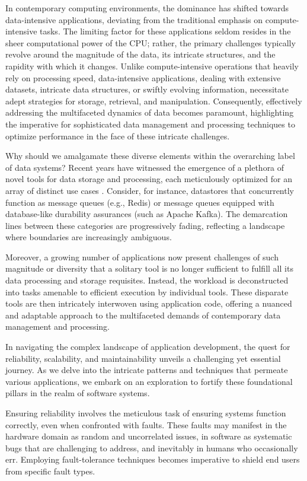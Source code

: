 
In contemporary computing environments, the dominance has shifted towards data-intensive applications,
deviating from the traditional emphasis on compute-intensive tasks.
The limiting factor for these applications seldom resides in the sheer computational power of the CPU;
rather, the primary challenges typically revolve around the magnitude of the data, its intricate structures,
and the rapidity with which it changes. Unlike compute-intensive operations that heavily rely on processing speed,
data-intensive applications, dealing with extensive datasets, intricate data structures, or swiftly evolving information,
necessitate adept strategies for storage, retrieval, and manipulation.
Consequently, effectively addressing the multifaceted dynamics of data becomes paramount,
highlighting the imperative for sophisticated data management and processing techniques to optimize performance in the face of these intricate challenges.

Why should we amalgamate these diverse elements within the overarching label of data systems?
Recent years have witnessed the emergence of a plethora of novel tools for data storage and processing,
each meticulously optimized for an array of distinct use cases \cite{stonebraker2005onesize}.
Consider, for instance, datastores that concurrently function as message queues (e.g., Redis)
or message queues equipped with database-like durability assurances (such as Apache Kafka).
The demarcation lines between these categories are progressively fading, reflecting a landscape where boundaries are increasingly ambiguous.

Moreover, a growing number of applications now present challenges of such magnitude or diversity that a solitary tool is no longer sufficient to fulfill all its data processing and storage requisites. Instead, the workload is deconstructed into tasks amenable to efficient execution by individual tools. These disparate tools are then intricately interwoven using application code, offering a nuanced and adaptable approach to the multifaceted demands of contemporary data management and processing.

In navigating the complex landscape of application development, the quest for reliability, scalability, and maintainability unveils a challenging yet essential journey. As we delve into the intricate patterns and techniques that permeate various applications, we embark on an exploration to fortify these foundational pillars in the realm of software systems.

Ensuring reliability involves the meticulous task of ensuring systems function correctly, even when confronted with faults. These faults may manifest in the hardware domain as random and uncorrelated issues, in software as systematic bugs that are challenging to address, and inevitably in humans who occasionally err. Employing fault-tolerance techniques becomes imperative to shield end users from specific fault types.

